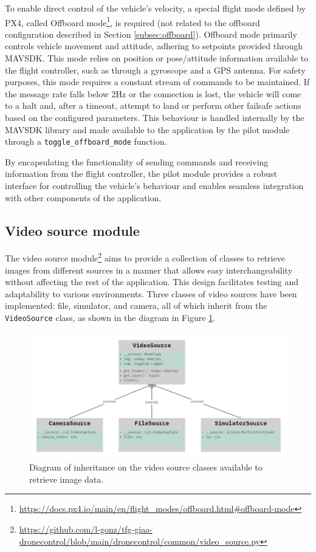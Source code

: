 To enable direct control of the vehicle's velocity, a special flight mode defined by PX4, called Offboard mode\footnote{\url{https://docs.px4.io/main/en/flight_modes/offboard.html\#offboard-mode}}, is required (not related to the offboard configuration described in Section \ref{subsec:offboard}). Offboard mode primarily controls vehicle movement and attitude, adhering to setpoints provided through MAVSDK. This mode relies on position or pose/attitude information available to the flight controller, such as through a gyroscope and a GPS antenna. 
For safety purposes, this mode requires a constant stream of commands to be maintained.
If the message rate falls below 2Hz or the connection is lost, the vehicle will come to a halt and, after a timeout, attempt to land or perform other failsafe actions based on the configured parameters.
This behaviour is handled internally by the MAVSDK library and made available to the application by the pilot module through a \texttt{toggle\_offboard\_mode} function.

By encapsulating the functionality of sending commands and receiving information from the flight controller, the pilot module provides a robust interface for controlling the vehicle's behaviour and enables seamless integration with other components of the application.


\subsection{Video source module}
\label{subsec:viz-source-module}

The video source module\footnote{\url{https://github.com/l-gonz/tfg-giaa-dronecontrol/blob/main/dronecontrol/common/video_source.py}} aims to provide a collection of classes to retrieve images from different sources in a manner that allows easy interchangeability without affecting the rest of the application. 
This design facilitates testing and adaptability to various environments. Three classes of video sources have been implemented: file, simulator, and camera, all of which inherit from the \texttt{VideoSource} class, as shown in the diagram in Figure \ref{fig:video-source-inheritance}.

\begin{figure}
  \centering
  \includegraphics[width=\textwidth, keepaspectratio]{img/uml-video-source.jpg}
  \caption{Diagram of inheritance on the video source classes available to retrieve image data.}
  \label{fig:video-source-inheritance}
\end{figure}

